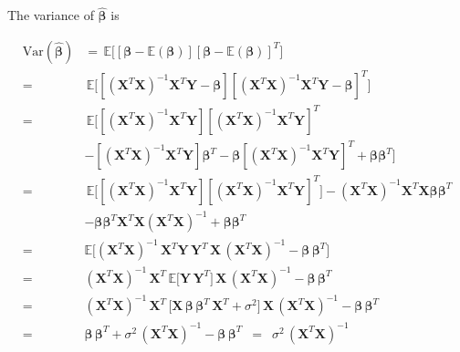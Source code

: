 \documentclass[a4paper,12pt]{article}
\begin{document}
\noindent
The variance of $\boldsymbol{\boldsymbol{\hat{\beta}}}$ is

\begin{equation} \label{eq1}
\begin{split}
\mbox{Var}(\boldsymbol{\hat{\beta}}) &= \, \mathbb{E} \big[[\boldsymbol{\beta} - \mathbb{E}(\boldsymbol{\beta})] [\boldsymbol{\beta} - \mathbb{E}(\boldsymbol{\beta})]^{T} \big]\\
=& \, \mathbb{E} \big[ [(\mathbf{X}^{T} \mathbf{X})^{-1}  \mathbf{X}^{T} \mathbf{Y} - \boldsymbol{\beta}]  [(\mathbf{X}^{T} \mathbf{X})^{-1}  \mathbf{X}^{T} \mathbf{Y} - \boldsymbol{\beta}]^{T} \big] \\
=& \, \mathbb{E} \big[ [(\mathbf{X}^{T} \mathbf{X})^{-1}  \mathbf{X}^{T} \mathbf{Y} ]  [(\mathbf{X}^{T} \mathbf{X})^{-1}  \mathbf{X}^{T} \mathbf{Y}]^{T} \\
&-[(\mathbf{X}^{T} \mathbf{X})^{-1}  \mathbf{X}^{T} \mathbf{Y} ] \boldsymbol{\beta}^T-\boldsymbol{\beta}[(\mathbf{X}^{T} \mathbf{X})^{-1}  \mathbf{X}^{T} \mathbf{Y} ]^T+\boldsymbol{\beta}\boldsymbol{\beta}^T\big]\\
=& \, \mathbb{E} \big[ [(\mathbf{X}^{T} \mathbf{X})^{-1}  \mathbf{X}^{T} \mathbf{Y} ]  [(\mathbf{X}^{T} \mathbf{X})^{-1}  \mathbf{X}^{T} \mathbf{Y}]^{T}\big]-(\mathbf{X}^{T} \mathbf{X})^{-1}  \mathbf{X}^{T} \mathbf{X}  \boldsymbol{\beta}\boldsymbol{\beta}^T\\
&-\boldsymbol{\beta}\boldsymbol{\beta}^T  \mathbf{X}^{T} \mathbf{X} (\mathbf{X}^{T} \mathbf{X})^{-1}+\boldsymbol{\beta}\boldsymbol{\beta}^T\\
 =& \mathbb{E}  \big[ (\mathbf{X}^{T} \mathbf{X})^{-1} \, \mathbf{X}^{T} \mathbf{Y} \, \mathbf{Y}^{T} \, \mathbf{X} \, (\mathbf{X}^{T} \mathbf{X})^{-1}    - \boldsymbol{\beta} \, \boldsymbol{\beta}^{T}\big]\\
 =& (\mathbf{X}^{T} \mathbf{X})^{-1} \, \mathbf{X}^{T} \, \mathbb{E} \big[ \mathbf{Y} \, \mathbf{Y}^{T} \big] \, \mathbf{X} \, (\mathbf{X}^{T} \mathbf{X})^{-1} - \boldsymbol{\beta} \, \boldsymbol{\beta}^{T}\\
 =& (\mathbf{X}^{T} \mathbf{X})^{-1} \, \mathbf{X}^{T} \, \big[ \mathbf{X} \, \boldsymbol{\beta} \, \boldsymbol{\beta}^{T} \,  \mathbf{X}^{T} + \sigma^2 \big] \, \mathbf{X} \, (\mathbf{X}^{T} \mathbf{X})^{-1} - \boldsymbol{\beta} \, \boldsymbol{\beta}^{T}\\
 =& \boldsymbol{\beta} \, \boldsymbol{\beta}^{T}  + \sigma^2 \, (\mathbf{X}^{T} \mathbf{X})^{-1} - \boldsymbol{\beta} \, \boldsymbol{\beta}^{T}
\, \, \, = \, \, \, \sigma^2 \, (\mathbf{X}^{T} \mathbf{X})^{-1}
\end{split}
\end{equation}
\end{document}
